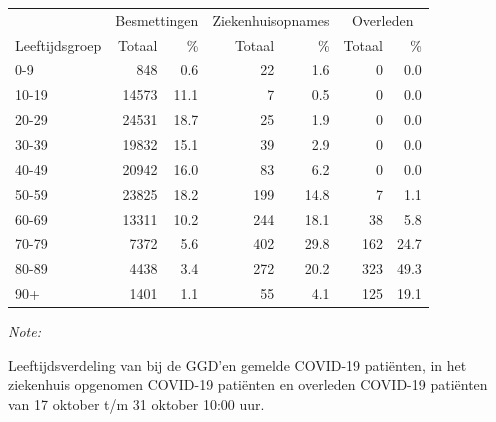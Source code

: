 \documentclass[
  english,
  man,floatsintext]{apa6}
\begin{document}
\begin{table}[H]
\centering\begingroup\fontsize{11}{13}\selectfont

\begin{threeparttable}
\begin{tabular}{lrrrrrr}
\toprule
\multicolumn{1}{c}{ } & \multicolumn{2}{c}{Besmettingen} & \multicolumn{2}{c}{Ziekenhuisopnames} & \multicolumn{2}{c}{Overleden} \\
\cmidrule(l{3pt}r{3pt}){2-3} \cmidrule(l{3pt}r{3pt}){4-5} \cmidrule(l{3pt}r{3pt}){6-7}
Leeftijdsgroep & Totaal & \% & Totaal & \% & Totaal & \%\\
\midrule
0-9 & 848 & 0.6 & 22 & 1.6 & 0 & 0.0\\
10-19 & 14573 & 11.1 & 7 & 0.5 & 0 & 0.0\\
20-29 & 24531 & 18.7 & 25 & 1.9 & 0 & 0.0\\
30-39 & 19832 & 15.1 & 39 & 2.9 & 0 & 0.0\\
40-49 & 20942 & 16.0 & 83 & 6.2 & 0 & 0.0\\
50-59 & 23825 & 18.2 & 199 & 14.8 & 7 & 1.1\\
60-69 & 13311 & 10.2 & 244 & 18.1 & 38 & 5.8\\
70-79 & 7372 & 5.6 & 402 & 29.8 & 162 & 24.7\\
80-89 & 4438 & 3.4 & 272 & 20.2 & 323 & 49.3\\
90+ & 1401 & 1.1 & 55 & 4.1 & 125 & 19.1\\
\bottomrule
\end{tabular}
\begin{tablenotes}
\item \textit{Note: } 
\item Leeftijdsverdeling van bij de GGD’en gemelde COVID-19 patiënten, in het ziekenhuis opgenomen COVID-19 patiënten en overleden COVID-19 patiënten van 17 oktober t/m 31 oktober 10:00 uur.
\end{tablenotes}
\end{threeparttable}
\endgroup{}
\end{table}
\end{document}
